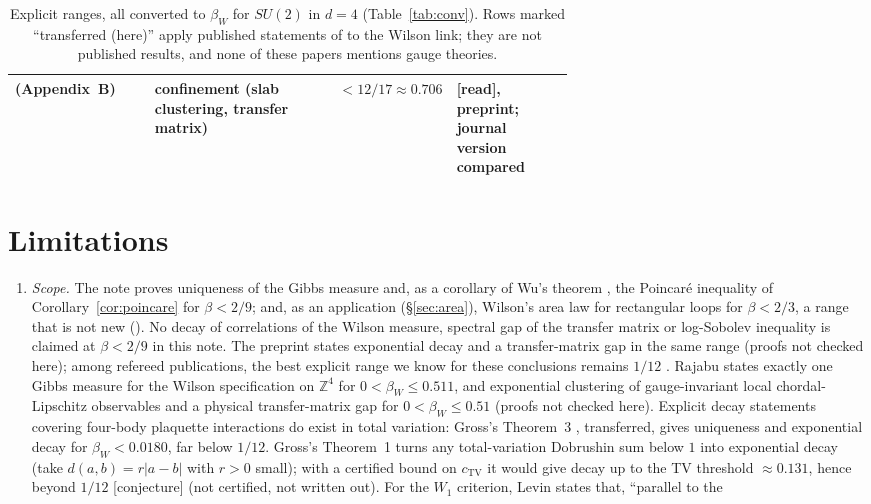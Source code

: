 \documentclass[11pt,a4paper]{article}
\theoremstyle{remark}
\theoremstyle{definition}
\theoremstyle{plain}
\theoremstyle{remark}
\newcommand{\Z}{\mathbb{Z}}
\newcommand{\st}[1]{\textsf{[#1]}}
\begin{document}
\begin{table}[htbp]
\begin{tabularx}{\linewidth}{@{}>{\raggedright\arraybackslash}p{0.25\linewidth}>{\raggedright\arraybackslash}X>{\raggedright\arraybackslash}p{0.19\linewidth}>{\raggedright\arraybackslash}p{0.21\linewidth}@{}}
\cite{BS83} (Appendix~B) & confinement (slab clustering, transfer matrix) & $<12/17\approx0.706$ & \st{read}, preprint; journal version compared\\
\bottomrule
\end{tabularx}
\caption{Explicit ranges, all converted to $\beta_W$ for $SU(2)$ in $d=4$ (Table~\ref{tab:conv}). Rows marked
``transferred (here)'' apply published statements of \cite{Gro79,Sim79,Lev80,Roy86} to the Wilson link;
they are not published results, and none of these papers mentions gauge theories.}
\label{tab:comp}
\end{table}

\section{Limitations}\label{sec:limits}
\begin{enumerate}
\item \emph{Scope.} The note proves uniqueness of the Gibbs measure and, as a corollary of Wu's theorem \cite{Wu06}, the Poincar\'e
inequality of Corollary~\ref{cor:poincare} for $\beta<2/9$; and, as an application (\S\ref{sec:area}), Wilson's area law for rectangular
loops for $\beta<2/3$, a range that is not new (\cite{BS83}). No decay of correlations of the Wilson measure, spectral gap of the
transfer matrix or log-Sobolev inequality is claimed at $\beta<2/9$ in this note. The preprint \cite{BB26} states exponential decay and a transfer-matrix gap
in the same range (proofs not checked here); among refereed publications, the best explicit range we know for
these conclusions remains $1/12$ \cite{SZZ23}. Rajabu \cite[Theorem~9.1(i)--(iii)]{Raj26b} states exactly one Gibbs measure for the Wilson specification on $\Z^4$ for $0<\beta_W\le0.511$, and exponential clustering of gauge-invariant local chordal-Lipschitz observables and a physical transfer-matrix gap for $0<\beta_W\le0.51$ (proofs not checked here). Explicit decay statements covering four-body plaquette interactions do exist in total
variation: Gross's Theorem~3 \cite{Gro79}, transferred, gives uniqueness and exponential decay for
$\beta_W<0.0180$, far below $1/12$. Gross's Theorem~1 \cite[p.~11]{Gro79} turns any total-variation Dobrushin sum
below $1$ into exponential decay (take $d(a,b)=r|a-b|$ with $r>0$ small); with a certified bound on $c_{\mathrm{TV}}$
it would give decay up to the TV threshold $\approx0.131$, hence beyond $1/12$ \st{conjecture} (not certified,
not written out). For the $W_1$ criterion, Levin \cite[Remark~3.5, p.~72]{Lev80} states that, ``parallel to the

\end{enumerate}
\end{document}
